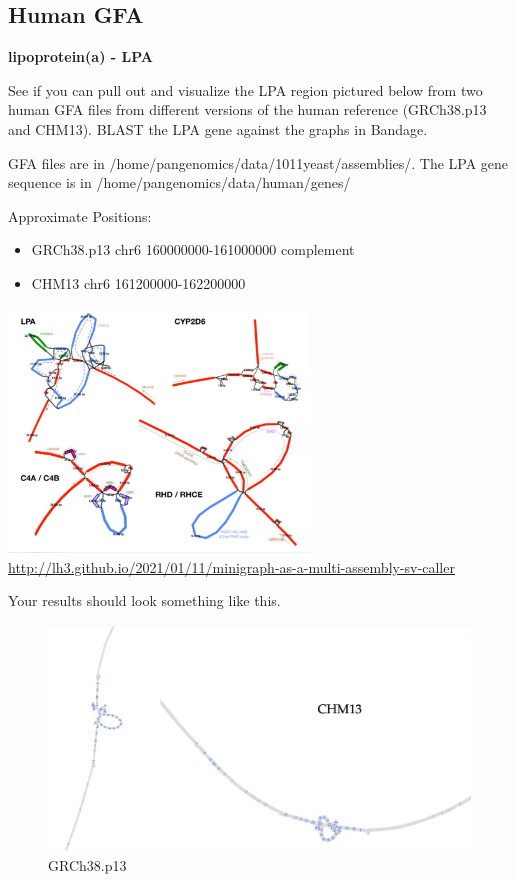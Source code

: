 \documentclass[
]{book}
\begin{document}
\hypertarget{human-gfa}{%
\subsection*{Human GFA}\label{human-gfa}}

\textbf{lipoprotein(a) - LPA}

See if you can pull out and visualize the LPA region pictured below from two human GFA files from different versions of the human reference (GRCh38.p13 and CHM13). BLAST the LPA gene against the graphs in Bandage.

GFA files are in /home/pangenomics/data/1011yeast/assemblies/. The LPA gene sequence is in /home/pangenomics/data/human/genes/

Approximate Positions:

\begin{itemize}
\item
  GRCh38.p13 chr6 160000000-161000000 complement
\item
  CHM13 chr6 161200000-162200000
\end{itemize}

\includegraphics[width=0.6\textwidth,height=\textheight]{./Figures/LPA.png}
\url{http://lh3.github.io/2021/01/11/minigraph-as-a-multi-assembly-sv-caller}

Your results should look something like this.

\begin{figure}
\centering
\includegraphics[width=1\textwidth,height=\textheight]{./Figures/GRCh38.p13.png}
\caption{GRCh38.p13}
\end{figure}
\end{document}
